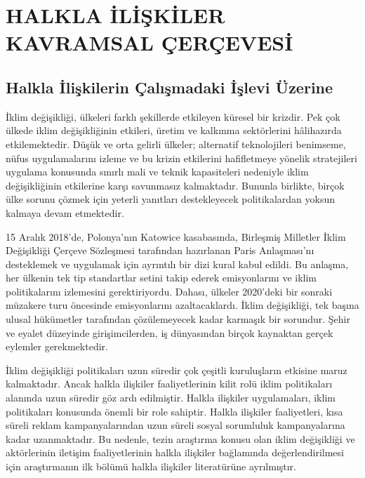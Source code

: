 \documentclass[
]{book}
\begin{document}
\hypertarget{intro}{%
\chapter{HALKLA İLİŞKİLER KAVRAMSAL ÇERÇEVESİ}\label{intro}}

\hypertarget{halkla-iliux15fkilerin-uxe7alux131ux15fmadaki-iux15flevi-uxfczerine}{%
\section{Halkla İlişkilerin Çalışmadaki İşlevi Üzerine}\label{halkla-iliux15fkilerin-uxe7alux131ux15fmadaki-iux15flevi-uxfczerine}}

İklim değişikliği, ülkeleri farklı şekillerde etkileyen küresel bir krizdir. Pek çok ülkede iklim değişikliğinin etkileri, üretim ve kalkınma sektörlerini hâlihazırda etkilemektedir. Düşük ve orta gelirli ülkeler; alternatif teknolojileri benimseme, nüfus uygulamalarını izleme ve bu krizin etkilerini hafifletmeye yönelik stratejileri uygulama konusunda sınırlı mali ve teknik kapasiteleri nedeniyle iklim değişikliğinin etkilerine karşı savunmasız kalmaktadır. Bununla birlikte, birçok ülke sorunu çözmek için yeterli yanıtları destekleyecek politikalardan yoksun kalmaya devam etmektedir. \citep{glasgow2018public}

15 Aralık 2018'de, Polonya'nın Katowice kasabasında, Birleşmiş Milletler İklim Değişikliği Çerçeve Sözleşmesi tarafından hazırlanan Paris Anlaşması'nı desteklemek ve uygulamak için ayrıntılı bir dizi kural kabul edildi. Bu anlaşma, her ülkenin tek tip standartlar setini takip ederek emisyonlarını ve iklim politikalarını izlemesini gerektiriyordu. Dahası, ülkeler 2020'deki bir sonraki müzakere turu öncesinde emisyonlarını azaltacaklardı. İklim değişikliği, tek başına ulusal hükümetler tarafından çözülemeyecek kadar karmaşık bir sorundur. Şehir ve eyalet düzeyinde girişimcilerden, iş dünyasından birçok kaynaktan gerçek eylemler gerekmektedir. \citep{dhanda2019climate}

İklim değişikliği politikaları uzun süredir çok çeşitli kuruluşların etkisine maruz kalmaktadır. Ancak halkla ilişkiler faaliyetlerinin kilit rolü iklim politikaları alanında uzun süredir göz ardı edilmiştir. Halkla ilişkiler uygulamaları, iklim politikaları konusunda önemli bir role sahiptir. Halkla ilişkiler faaliyetleri, kısa süreli reklam kampanyalarından uzun süreli sosyal sorumluluk kampanyalarına kadar uzanmaktadır.\citep{brulle2021role} Bu nedenle, tezin araştırma konusu olan iklim değişikliği ve aktörlerinin iletişim faaliyetlerinin halkla ilişkiler bağlamında değerlendirilmesi için araştırmanın ilk bölümü halkla ilişkiler literatürüne ayrılmıştır.
\end{document}
